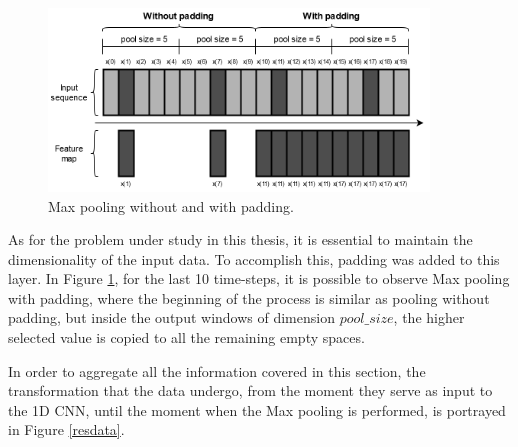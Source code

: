 \begin{figure}[h!]
    \centering
    \begin{center}
    \includegraphics[width=0.9\textwidth]{Images/maxpooling.png}
    \caption{Max pooling without and with padding.}
    \label{maxpooling}
    \end{center}
\end{figure}

As for the problem under study in this thesis, it is essential to maintain the dimensionality of the input data. To accomplish this, padding was added to this layer. In Figure \ref{maxpooling}, for the last 10 time-steps, it is possible to observe Max pooling with padding, where the beginning of the process is similar as pooling without padding, but inside the output windows of dimension $pool\_size$, the higher selected value is copied to all the remaining empty spaces. 

In order to aggregate all the information covered in this section, the transformation that the data undergo, from the moment they serve as input to the 1D CNN, until the moment when the Max pooling  is performed, is portrayed in Figure \ref{resdata}.

